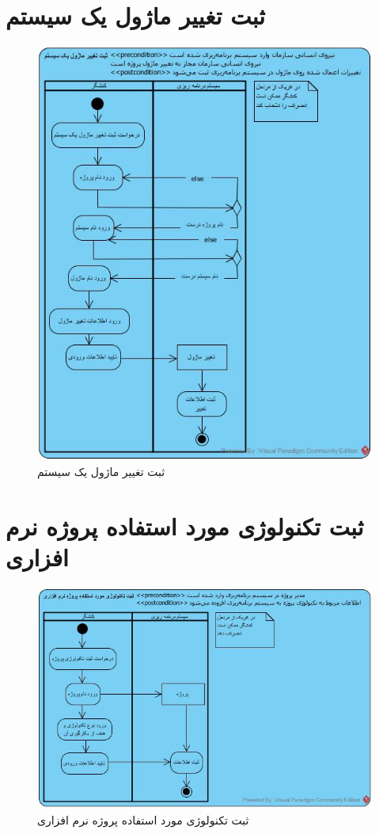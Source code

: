 \section{ثبت تغییر ماژول یک سیستم}
\begin{figure}[H]
	\centering
	\includegraphics[scale=0.7]{img/activity/AddModuleModification}
	\caption{ثبت تغییر ماژول یک سیستم}
\end{figure}


\section{ثبت تکنولوژی مورد استفاده پروژه نرم افزاری}
\begin{figure}[H]
	\centering
	\includegraphics[scale=0.7]{img/activity/AddTechnology}
	\caption{ثبت تکنولوژی مورد استفاده پروژه نرم افزاری}
\end{figure}

